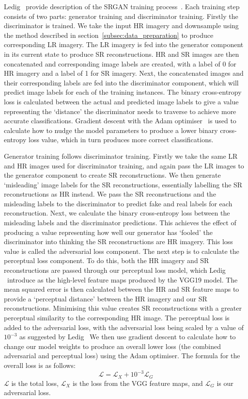 Ledig \etal\ provide description of the SRGAN training process~\cite{srgan}. Each training step consists of two parts: generator training and discriminator training. Firstly the discriminator is trained. We take the input HR imagery and downsample using the method described in section~\ref{subsec:data_preparation} to produce corresponding LR imagery. The LR imagery is fed into the generator component in its current state to produce SR reconstructions. HR and SR images are then concatenated and corresponding image labels are created, with a label of 0 for HR imagery and a label of 1 for SR imagery. Next, the concatenated images and their corresponding labels are fed into the discriminator component, which will predict image labels for each of the training instances. The binary cross-entropy loss is calculated between the actual and predicted image labels to give a value representing the `distance' the discriminator needs to traverse to achieve more accurate classifications. Gradient descent with the Adam optimiser~\cite{adamOptimiser} is used to calculate how to nudge the model parameters to produce a lower binary cross-entropy loss value, which in turn produces more correct classifications.

Generator training follows discriminator training. Firstly we take the same LR and HR images used for discriminator training, and again pass the LR images to the generator component to create SR reconstructions. We then generate `misleading' image labels for the SR reconstructions, essentially labelling the SR reconstructions as HR instead. We pass the SR reconstructions and the misleading labels to the discriminator to predict fake and real labels for each reconstruction. Next, we calculate the binary cross-entropy loss between the misleading labels and the discriminator predictions. This achieves the effect of producing a value representing how well our generator has `fooled' the discriminator into thinking the SR reconstructions are HR imagery. This loss value is called the adversarial loss component. The next step is to calculate the perceptual loss component. To do this, both the HR imagery and SR reconstructions are passed through our perceptual loss model, which Ledig \etal\ introduce as the high-level feature maps produced by the VGG19 model. The mean squared error is then calculated between the HR and SR feature maps to provide a `perceptual distance' between the HR imagery and our SR reconstructions. Minimising this value creates SR reconstructions with a greater perceptual similarity to the corresponding HR image. The perceptual loss is added to the adversarial loss, with the adversarial loss being scaled by a value of $10^{-3}$ as suggested by Ledig \etal\ We then use gradient descent to calculate how to change our model weights to produce an overall lower loss (the combined adversarial and perceptual loss) using the Adam optimiser. The formula for the overall loss is as follows:
\begin{equation}
    \mathcal{L} = \mathcal{L}_X + 10^{-3}\mathcal{L}_G
\end{equation}
$\mathcal{L}$ is the total loss, $\mathcal{L}_X$ is the loss from the VGG feature maps, and $\mathcal{L}_G$ is our adversarial loss.

